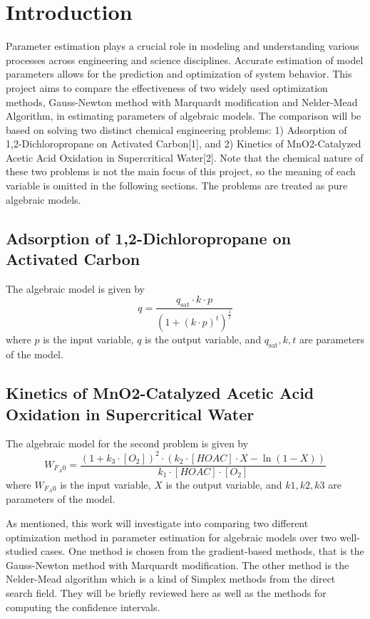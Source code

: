\documentclass[12pt]{article} %
\begin{document}
\section{Introduction}
Parameter estimation plays a crucial role in modeling and understanding various processes across
engineering and science disciplines. Accurate estimation of model parameters allows for the
prediction and optimization of system behavior. This project aims to compare the effectiveness
of two widely used optimization methods, Gauss-Newton method with Marquardt modification and Nelder-Mead Algorithm,
in estimating parameters of algebraic models. The comparison will be based on solving two
distinct chemical engineering problems: 1) Adsorption of 1,2-Dichloropropane on Activated
Carbon[1], and 2) Kinetics of MnO2-Catalyzed Acetic Acid Oxidation in Supercritical Water[2].
Note that the chemical nature of these two problems is not the main focus of this project, 
so the meaning of each variable is omitted in the following sections. The problems are treated
as pure algebraic models.
\subsection{Adsorption of 1,2-Dichloropropane on Activated Carbon}
The algebraic model is given by
\begin{equation}
    q = \frac{q_{\text{sat}} \cdot k \cdot p}{(1 + (k \cdot p)^t)^{\frac{1}{t}}}
\end{equation}
where \( p \) is the input variable, \( q \) is the output variable, and \( q_{\text{sat}}, k, t \) are parameters of the model.
\subsection{Kinetics of MnO2-Catalyzed Acetic Acid Oxidation in Supercritical Water}
The algebraic model for the second problem is given by
\begin{equation}
    W_{F_A0} = \frac{(1 + k_3 \cdot [O_2])^2 \cdot (k_2 \cdot [HOAC] \cdot X - \ln(1-X))}{k_1 \cdot [HOAC] \cdot [O_2]}
\end{equation}
where \( W_{F_A0} \) is the input variable, \( X \) is the output variable, and \( k1, k2, k3 \) are parameters of the model.

As mentioned, this work will investigate into comparing two different optimization method in parameter estimation for algebraic models over two well-studied cases. One method is chosen from the gradient-based methods, that is the Gauss-Newton method with Marquardt modification. The other method is the Nelder-Mead algorithm which
is a kind of Simplex methods from the direct search field. They will be briefly reviewed here as well as the methods for computing the confidence intervals. 
\end{document}
